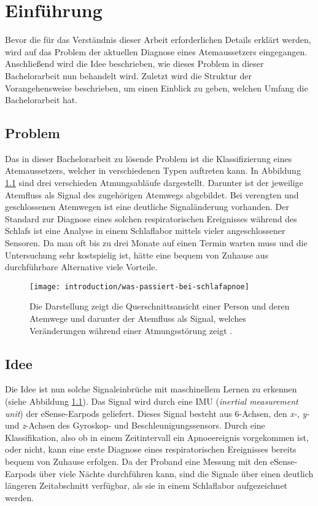 
\chapter{Einführung}
\label{ch:Introduction}
Bevor die für das Verständnis dieser Arbeit erforderlichen Details erklärt werden, wird auf das Problem der aktuellen Diagnose eines Atemaussetzers eingegangen. 
Anschließend wird die Idee beschrieben, wie dieses Problem in dieser Bachelorarbeit nun behandelt wird.
Zuletzt wird die Struktur der Vorangehensweise beschrieben, um einen Einblick zu geben, welchen Umfang die Bachelorarbeit hat.

\section{Problem}
Das in dieser Bachelorarbeit zu lösende Problem ist die Klassifizierung eines Atemaussetzers, welcher in verschiedenen Typen auftreten kann. 
In Abbildung \ref{introduction:problem_description} sind drei verschieden Atmungsabläufe dargestellt. 
Darunter ist der jeweilige Atemfluss als Signal des zugehörigen Atemwegs abgebildet.
Bei verengten und geschlossenen Atemwegen ist eine deutliche Signaländerung vorhanden. 
Der Standard zur Diagnose eines solchen respiratorischen Ereignisses während des Schlafs ist eine Analyse in einem Schlaflabor mittels vieler angeschlossener Sensoren. 
Da man oft bis zu drei Monate auf einen Termin warten muss und die Untersuchung sehr kostspielig ist, hätte eine bequem von Zuhause aus durchführbare Alternative viele Vorteile.


\begin{figure}[h]
  \centering
  \texttt{[image: introduction/was-passiert-bei-schlafapnoe]}  
  \caption{Die Darstellung zeigt die Querschnittsansicht einer Person und deren Atemwege und darunter der Atemfluss als Signal, welches Veränderungen während einer Atmungsstörung zeigt \cite{DeutscheFamilienversicherungSchlafapnoesyndrom}.}
  \label{introduction:problem_description}
\end{figure}

\newpage

\section{Idee}
Die Idee ist nun solche Signaleinbrüche mit maschinellem Lernen zu erkennen (siehe Abbildung \ref{introduction:problem_description}). 
Das Signal wird durch eine IMU (\textit{inertial measurement unit}) der eSense-Earpods geliefert.
Dieses Signal besteht aus 6-Achsen, den \textit{x-}, \textit{y-} und \textit{z}-Achsen des Gyroskop- und Beschleunigungssensors.
Durch eine Klassifikation, also ob in einem Zeitintervall ein Apnoeereignis vorgekommen ist, oder nicht, kann eine erste Diagnose eines respiratorischen Ereignisses bereits bequem von Zuhause erfolgen.
Da der Proband eine Messung mit den eSense-Earpods über viele Nächte durchführen kann, sind die Signale über einen deutlich längeren Zeitabschnitt verfügbar, als sie in einem Schlaflabor aufgezeichnet werden.

